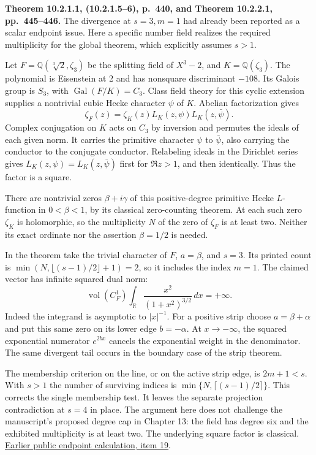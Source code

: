 \documentclass[11pt]{article}
\newcommand{\R}{\mathbb R}\newcommand{\Q}{\mathbb Q}\newcommand{\C}{\mathbb C}
\newcommand{\page}[1]{\newpage{\Large\bfseries\color{ink}#1}\par\smallskip}
\begin{document}
\page{An actual multiple zero at the jet endpoint}
\textbf{Theorem 10.2.1.1, (10.2.1.5--6), p.~440, and Theorem 10.2.2.1, pp.~445--446.}
The divergence at \(s=3,m=1\) had already been reported as a scalar endpoint issue. Here a specific number field realizes the required multiplicity for the global theorem, which explicitly assumes \(s>1\).

Let \(F=\Q(\sqrt[3]{2},\zeta_3)\) be the splitting field of \(X^3-2\), and \(K=\Q(\zeta_3)\). The polynomial is Eisenstein at 2 and has nonsquare discriminant \(-108\). Its Galois group is \(S_3\), with \(\operatorname{Gal}(F/K)=C_3\). Class field theory for this cyclic extension supplies a nontrivial cubic Hecke character \(\psi\) of \(K\). Abelian factorization gives
\[
                   \zeta_F(z)=\zeta_K(z)L_K(z,\psi)L_K(z,\bar\psi).
\]
Complex conjugation on \(K\) acts on \(C_3\) by inversion and permutes the ideals of each given norm. It carries the primitive character \(\psi\) to \(\bar\psi\), also carrying the conductor to the conjugate conductor. Relabeling ideals in the Dirichlet series gives \(L_K(z,\psi)=L_K(z,\bar\psi)\) first for \(\Re z>1\), and then identically. Thus the factor is a square.

There are nontrivial zeros \(\beta+i\gamma\) of this positive-degree primitive Hecke \(L\)-function in \(0<\beta<1\), by its classical zero-counting theorem. At each such zero \(\zeta_K\) is holomorphic, so the multiplicity \(N\) of the zero of \(\zeta_F\) is at least two. Neither its exact ordinate nor the assertion \(\beta=1/2\) is needed.

In the theorem take the trivial character of \(F\), \(a=\beta\), and \(s=3\). Its printed count is \(\min(N,\lfloor(s-1)/2\rfloor+1)=2\), so it includes the index \(m=1\). The claimed vector has infinite squared dual norm:
\[
   \operatorname{vol}(C_F^1)\int_{\R}\frac{x^2}{(1+x^2)^{3/2}}\,dx=+\infty .
\]
Indeed the integrand is asymptotic to \(|x|^{-1}\). For a positive strip choose \(a=\beta+\alpha\) and put this same zero on its lower edge \(b=-\alpha\). At \(x\to-\infty\), the squared exponential numerator \(e^{2bx}\) cancels the exponential weight in the denominator. The same divergent tail occurs in the boundary case of the strip theorem.

The membership criterion on the line, or on the active strip edge, is \(2m+1<s\). With \(s>1\) the number of surviving indices is \(\min\{N,\lceil(s-1)/2\rceil\}\). This corrects the single membership test. It leaves the separate projection contradiction at \(s=4\) in place. The argument here does not challenge the manuscript's proposed degree cap in Chapter 13: the field has degree six and the exhibited multiplicity is at least two. The underlying square factor is classical. \href{https://github.com/mccorvie/riemann-masullo/issues/2469\#issuecomment-7057757662}{Earlier public endpoint calculation, item 19}.
\end{document}
